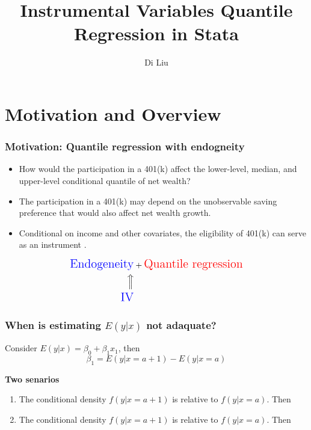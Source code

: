 \documentclass[11pt]{beamer}
\title{Instrumental Variables Quantile Regression in Stata}
\author{Di Liu}
\institute{StataCorp}
\date{}
\begin{document}
\maketitle

\section{Motivation and Overview}

\begin{frame}
  \frametitle{Motivation: Quantile regression with endogneity}
  \begin{itemize}
    \setlength\itemsep{1em}

    \item {} How would the participation in a 401(k)
      affect the lower-level, median, and upper-level conditional quantile of
      net wealth? 

    \item {} The participation in a 401(k) may depend on
      the unobservable saving preference that would also affect net wealth
      growth.

    \item {} Conditional on income and other covariates, the
      eligibility of 401(k) can serve as an instrument \citep{Poterba1995}.
  \end{itemize}

  \begin{align*}
    \text{\Large {\color{blue}{Endogeneity}}} & 
  	+ \text{\Large {\color{red}{Quantile regression}}} \\
  \Big \Uparrow \\
 \text{\Large {\color{blue}{IV}}}
\end{align*}
\end{frame}

\begin{frame}
  \frametitle{When is estimating $E(y|x)$ not adaquate?}
Consider $E(y|x) = \beta_0 + \beta_1 x_1$, then
$$\beta_1 = E(y| x = a+1) - E(y | x=a)$$

\vskip 0.4cm
{\bf Two senarios}
\begin{enumerate}
  \item The conditional density $f(y | x=a+1)$ is 
    relative to $f(y | x=a)$. Then 

  \item The conditional density $f(y | x=a+1)$ is  relative to $f(y | x=a)$. Then 


\end{enumerate}


\end{frame}
\end{document}
